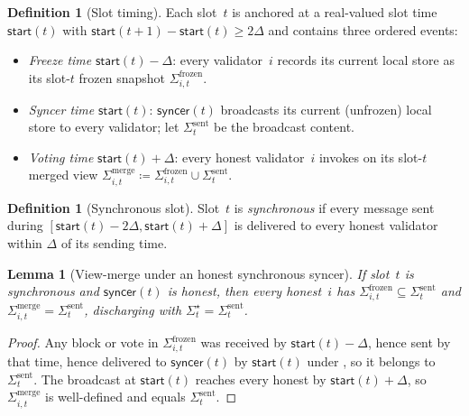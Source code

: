 \documentclass{article}
\newcommand{\syncer}{\mathsf{syncer}}
\newcommand{\start}{\mathsf{start}}
\theoremstyle{plain}
\newtheorem{lemma}{Lemma}
\theoremstyle{definition}
\newtheorem{definition}[theorem]{Definition}
\theoremstyle{remark}
\begin{document}
\begin{definition}[Slot timing]\label{rev:def:slot-timing}
Each slot~$t$ is anchored at a real-valued slot time $\start(t)$ with $\start(t+1) - \start(t) \geq 2\Delta$ and contains three ordered events:
\begin{itemize}
  \item \emph{Freeze time} $\start(t) - \Delta$: every validator~$i$ records its current local store as its slot-$t$ frozen snapshot $\Sigma^{\mathrm{frozen}}_{i,t}$.
  \item \emph{Syncer time} $\start(t)$: $\syncer(t)$ broadcasts its current (unfrozen) local store to every validator; let $\Sigma^{\mathrm{sent}}_t$ be the broadcast content.
  \item \emph{Voting time} $\start(t) + \Delta$: every honest validator~$i$ invokes  on its slot-$t$ merged view $\Sigma^{\mathrm{merge}}_{i,t} \coloneqq \Sigma^{\mathrm{frozen}}_{i,t} \cup \Sigma^{\mathrm{sent}}_t$.
\end{itemize}
\end{definition}

\begin{definition}[Synchronous slot]\label{rev:def:synchrony-window}
Slot~$t$ is \emph{synchronous} if every message sent during $[\start(t) - 2\Delta, \start(t) + \Delta]$ is delivered to every honest validator within $\Delta$ of its sending time.
\end{definition}

\begin{lemma}[View-merge under an honest synchronous syncer]\label{rev:lem:view-merge}
If slot~$t$ is synchronous and $\syncer(t)$ is honest, then every honest~$i$ has $\Sigma^{\mathrm{frozen}}_{i,t} \subseteq \Sigma^{\mathrm{sent}}_t$ and $\Sigma^{\mathrm{merge}}_{i,t} = \Sigma^{\mathrm{sent}}_t$, discharging  with $\Sigma^\star_t = \Sigma^{\mathrm{sent}}_t$.
\end{lemma}

\begin{proof}
Any block or vote in $\Sigma^{\mathrm{frozen}}_{i,t}$ was received by $\start(t) - \Delta$, hence sent by that time, hence delivered to $\syncer(t)$ by $\start(t)$ under , so it belongs to $\Sigma^{\mathrm{sent}}_t$.
The broadcast at $\start(t)$ reaches every honest by $\start(t) + \Delta$, so $\Sigma^{\mathrm{merge}}_{i,t}$ is well-defined and equals $\Sigma^{\mathrm{sent}}_t$.
\end{proof}
\end{document}

